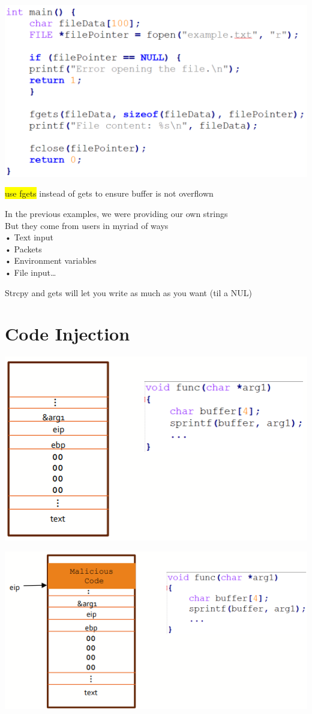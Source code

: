 \documentclass[]{project_plan}
\begin{document}
\includegraphics[width=.6\linewidth]{lec6 buffers eg3.png}

\colorbox{yellow}{use fgets} instead of gets to ensure buffer is not overflown


In the previous examples, we were providing our own strings\\
But they come from users in myriad of ways\\
• Text input\\
• Packets\\
• Environment variables\\
• File input…


Strcpy and gets will let you write as much as you want (til a NUL)

\section{Code Injection}

\includegraphics[width=.6\linewidth]{lec6 code injection high level idea 1.png}

\includegraphics[width=.6\linewidth]{lec6 code injection high level idea 3.png}
\end{document}
